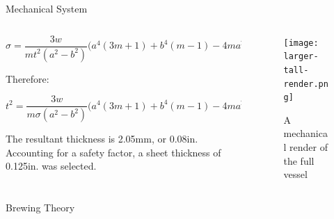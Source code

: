 \documentclass[final]{beamer}
\newlength{\onecolwid}
\newlength{\twocolwid}
\begin{document}
\begin{frame}[t]
\begin{columns}[t]
\begin{column}{\twocolwid}
\begin{block}{Mechanical System}
\begin{columns}[t,totalwidth=\twocolwid]
\begin{column}{\onecolwid}
\begin{justify}
\scriptsize
\begin{equation}
\sigma = \frac{3w}{mt^{2}(a^{2} - b^{2})}\Big(a^{4}(3m + 1) + b^{4}(m - 1) - 4ma^{2}b^{2} - 4(m + 1)a^{2}b^{2}\ln(\frac{a}{b}) \Big)
\label{eq:stress}
\end{equation}
\normalsize

\noindent Therefore:

\scriptsize
\begin{equation}
t^{2} = \frac{3w}{m\sigma(a^{2} - b^{2})}\Big(a^{4}(3m + 1) + b^{4}(m - 1) - 4ma^{2}b^{2} - 4(m + 1)a^{2}b^{2}\ln(\frac{a}{b}) \Big)
\end{equation}
\normalsize

The resultant thickness is 2.05mm, or 0.08in. Accounting for a safety factor, a sheet thickness of 0.125in. was selected.
\end{justify}

\end{column} %

\begin{column}{\onecolwid} %

\vspace{-.3in}
\begin{figure}
\texttt{[image: larger-tall-render.png]}
\caption{A mechanical render of the full vessel}
\end{figure}


\end{column} %

\end{columns} %
\end{block}


\begin{alertblock}{Brewing Theory}


\end{alertblock}
\end{column}
\end{columns}
\end{frame}
\end{document}
